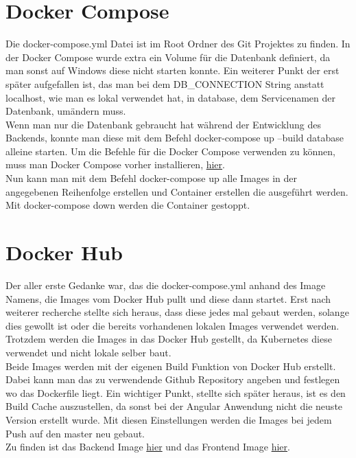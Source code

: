 \section{Docker Compose}
Die docker-compose.yml Datei ist im Root Ordner des Git Projektes zu finden.
In der Docker Compose wurde extra ein Volume für die Datenbank definiert, da man sonst auf Windows diese nicht starten konnte. Ein weiterer Punkt der erst später aufgefallen ist, das man bei dem DB\_CONNECTION String anstatt localhost, wie man es lokal verwendet hat, in database, dem Servicenamen der Datenbank, umändern muss.\\
Wenn man nur die Datenbank gebraucht hat während der Entwicklung des Backends, konnte man diese mit dem Befehl docker-compose up --build database alleine starten. Um die Befehle für die Docker Compose verwenden zu können, muss man Docker Compose vorher installieren, \hyperlink{https://docs.docker.com/compose/install/}{hier}.\\
Nun kann man mit dem Befehl docker-compose up alle Images in der angegebenen Reihenfolge erstellen und Container erstellen die ausgeführt werden. Mit docker-compose down werden die Container gestoppt.

\section{Docker Hub}
Der aller erste Gedanke war, das die docker-compose.yml anhand des Image Namens, die Images vom Docker Hub pullt und diese dann startet. Erst nach weiterer recherche stellte sich heraus, dass diese jedes mal gebaut werden, solange dies gewollt ist oder die bereits vorhandenen lokalen Images verwendet werden.\\
Trotzdem werden die Images in das Docker Hub gestellt, da Kubernetes diese verwendet und nicht lokale selber baut.\\
Beide Images werden mit der eigenen Build Funktion von Docker Hub erstellt. Dabei kann man das zu verwendende Github Repository angeben und festlegen wo das Dockerfile liegt. Ein wichtiger Punkt, stellte sich später heraus, ist es den Build Cache auszustellen, da sonst bei der Angular Anwendung nicht die neuste Version erstellt wurde.
Mit diesen Einstellungen werden die Images bei jedem Push auf den master neu gebaut.\\
Zu finden ist das Backend Image \hyperlink{https://hub.docker.com/repository/docker/drinkler/microservices-backend/general}{hier} und das Frontend Image \hyperlink{https://hub.docker.com/repository/docker/drinkler/microservices-frontend}{hier}.
